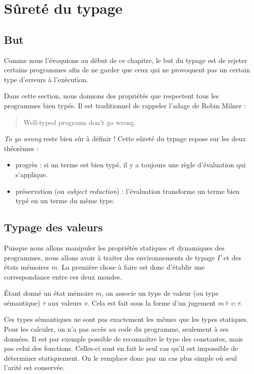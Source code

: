 \section{Sûreté du typage}

\subsection{But}

Comme nous l'évoquions au début de ce chapitre, le but du typage est de rejeter
certains programmes afin de ne garder que ceux qui ne provoquent pas un certain
type d'erreurs à l'exécution.

Dans cette section, nous donnons des propriétés que respectent tous les
programmes bien typés. Il est traditionnel de rappeler l'adage de Robin Milner :

\begin{quote}
  Well-typed programs don't go wrong.
\end{quote}

\emph{To go wrong} reste bien sûr à définir ! Cette sûreté du typage repose sur
les deux théorèmes :

\begin{itemize}
\item progrès :
  si un terme est bien typé, il y a toujours une règle
  d'évaluation qui s'applique.
\item
  préservation (ou \emph{subject reduction}) :
  l'évaluation transforme un terme bien typé en un terme du même type.
\end{itemize}

\subsection{Typage des valeurs}

Puisque nous allons manipuler les propriétés statiques et dynamiques des
programmes, nous allons avoir à traiter des environnements de typage $Γ$ et des
états mémoires $m$. La première chose à faire est donc d'établir une
correspondance entre ces deux mondes.

Étant donné un état mémoire $m$, on associe un type de valeur (ou type
sémantique) $τ$ aux valeurs $v$. Cela est fait sous la forme d'un jugement $m ⊧
v : τ$.

Ces types sémantiques ne sont pas exactement les mêmes que les types statiques.
Pour les calculer, on n'a pas accès au code du programme, seulement à ses
données. Il est par exemple possible de reconnaître le type des constantes,
mais pas celui des fonctions. Celles-ci sont en fait le seul cas qu'il est
impossible de déterminer statiquement. On le remplace donc par un cas plus
simple où seul l'arité est conservée.

